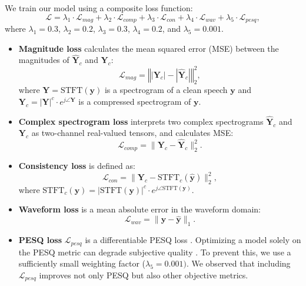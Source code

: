 We train our model using a composite loss function:
\begin{equation}
    \mathcal{L} = \lambda_{1}\cdot\mathcal{L}_{mag} + \lambda_{2}\cdot\mathcal{L}_{comp} +
                  \lambda_{3}\cdot\mathcal{L}_{con} + \lambda_{4}\cdot\mathcal{L}_{wav} + \lambda_{5}\cdot\mathcal{L}_{pesq},
\end{equation}
where $\lambda_{1}=0.3$, $\lambda_{2}=0.2$, $\lambda_{3}=0.3$, $\lambda_{4}=0.2$, and $\lambda_{5}=0.001$.

\begin{itemize}[leftmargin=1em]
    \item\textbf{Magnitude loss} calculates the mean squared error (MSE) between the magnitudes of $\mathbf{\hat{Y}}_c$ and $\mathbf{Y}_c$:
    \begin{equation}
        \mathcal{L}_{mag} = \left\Vert |\mathbf{Y}_c|-|\mathbf{\hat{Y}}_c| \right\Vert_2^2,
    \end{equation}
    where $\mathbf{Y}=\text{STFT}(\mathbf{y})$ is a spectrogram of a clean speech $\mathbf{y}$ and $\mathbf{Y}_c=|\textbf{Y}|^c\cdot e^{j \angle \textbf{Y}}$ is a compressed spectrogram of $\mathbf{y}$.
    
    \item\textbf{Complex spectrogram loss} interprets two complex spectrograms $\mathbf{\hat{Y}}_c$ and $\mathbf{Y}_c$ as two-channel real-valued tensors, and calculates MSE:
    \begin{equation}
        \mathcal{L}_{comp} = \| \mathbf{Y}_c-\mathbf{\hat{Y}}_c \|_2^2.
    \end{equation}
    
    \item\textbf{Consistency loss} is defined as:
    \begin{equation}
        \mathcal{L}_{con} = \| \mathbf{Y}_c - \text{STFT}_c(\mathbf{\hat{y}}) \|_2^2,
    \end{equation}
    where $\text{STFT}_c(\mathbf{y})= \left| \text{STFT}(\mathbf{y}) \right|^c\cdot e^{j \angle \text{STFT}(\mathbf{y})}$.
    
    \item\textbf{Waveform loss} is a mean absolute error in the waveform domain:
    \begin{equation}
        \mathcal{L}_{wav} = \| \mathbf{y}-\mathbf{\hat{y}} \|_1.
    \end{equation}
    
    \item\textbf{PESQ loss} $\mathcal{L}_{pesq}$ is a differentiable PESQ loss \cite{torch-pesq}. Optimizing a model solely on the PESQ metric can degrade subjective quality \cite{pesqetarian}. To prevent this, we use a sufficiently small weighting factor ($\lambda_5=0.001)$. We observed that including $\mathcal{L}_{pesq}$ improves not only PESQ but also other objective metrics.
\end{itemize}

